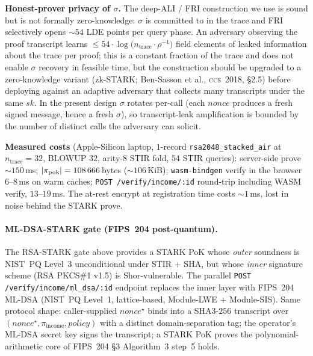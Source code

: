 \documentclass[11pt,a4paper]{article}
\begin{document}
\textbf{Honest\nobreakdash-prover privacy of $\sigma$.}  The
deep\nobreakdash-ALI / FRI construction we use is sound but is
not formally zero\nobreakdash-knowledge: $\sigma$ is committed
to in the trace and FRI selectively opens
$\sim\!\num{54}$ LDE points per query phase.  An adversary
observing the proof transcript learns $\le \num{54} \cdot
\log\bigl(n_{\mathrm{trace}} \cdot \rho^{-1}\bigr)$ field
elements of leaked information about the trace per proof; this
is a constant fraction of the trace and does not enable
$\sigma$ recovery in feasible time, but the construction
should be upgraded to a zero\nobreakdash-knowledge variant
(zk\nobreakdash-STARK; Ben\nobreakdash-Sasson et al., \textsc{ccs}~2018,
\S2.5) before deploying against an adaptive adversary that
collects many transcripts under the same $\mathit{sk}$.  In
the present design $\sigma$ rotates per\nobreakdash-call (each
$\mathit{nonce}$ produces a fresh signed message, hence a
fresh $\sigma$), so transcript\nobreakdash-leak amplification
is bounded by the number of distinct calls the adversary can
solicit.

\textbf{Measured costs} (Apple\nobreakdash-Silicon
laptop, $1$\nobreakdash-record \texttt{rsa2048\_stacked\_air} at
$n_{\mathrm{trace}} {=} 32$, BLOWUP $32$,
arity\nobreakdash-$8$ STIR fold,
$54$ STIR queries):
server\nobreakdash-side prove $\sim\!\num{150}$\,ms;
$|\pi_{\mathrm{pok}}| = \num{108\,666}$\,bytes ($\sim\!\num{106}$\,KiB);
\texttt{wasm-bindgen} verify in the browser
$\num{6}$--$\num{8}$\,ms on warm caches;
\texttt{POST /verify/income/:id} round\nobreakdash-trip including
WASM verify, $\num{13}$--$\num{19}$\,ms.  The at\nobreakdash-rest
encrypt at registration time costs $\sim\!\num{1}$\,ms, lost in
noise behind the STARK prove.

\paragraph{ML\nobreakdash-DSA\nobreakdash-STARK gate (FIPS~204
post\nobreakdash-quantum).}  The RSA\nobreakdash-STARK gate
above provides a STARK PoK whose \emph{outer} soundness is
NIST~PQ Level~3 unconditional under STIR + SHA,
but whose \emph{inner} signature scheme (RSA
PKCS\#1 v1.5) is Shor\nobreakdash-vulnerable.  The parallel
\texttt{POST /verify/income/ml\_dsa/:id} endpoint replaces the
inner layer with FIPS~204 ML\nobreakdash-DSA
(NIST~PQ Level~1, lattice\nobreakdash-based, Module\nobreakdash-LWE +
Module\nobreakdash-SIS).  Same protocol shape: caller\nobreakdash-supplied
$\mathit{nonce}^{\star}$ binds into a SHA3\nobreakdash-$256$
transcript over $(\mathit{nonce}^{\star},
\pi_{\mathrm{income}}, \mathit{policy})$ with a distinct
domain\nobreakdash-separation tag; the operator's
ML\nobreakdash-DSA secret key signs the
transcript; a STARK PoK proves the polynomial\nobreakdash-arithmetic
core of FIPS~204 §3 Algorithm~3 step~5 holds.
\end{document}
